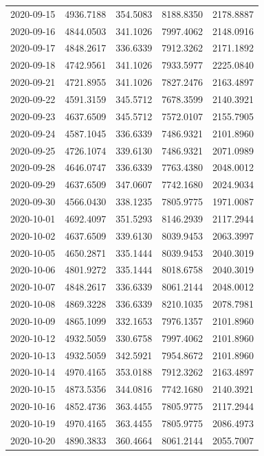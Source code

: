 \begin{footnotesize}
\begin{longtable}{lllll}
2020-09-15 & 4936.7188 & 354.5083 & 8188.8350 & 2178.8887 \\
2020-09-16 & 4844.0503 & 341.1026 & 7997.4062 & 2148.0916 \\
2020-09-17 & 4848.2617 & 336.6339 & 7912.3262 & 2171.1892 \\
2020-09-18 & 4742.9561 & 341.1026 & 7933.5977 & 2225.0840 \\
2020-09-21 & 4721.8955 & 341.1026 & 7827.2476 & 2163.4897 \\
2020-09-22 & 4591.3159 & 345.5712 & 7678.3599 & 2140.3921 \\
2020-09-23 & 4637.6509 & 345.5712 & 7572.0107 & 2155.7905 \\
2020-09-24 & 4587.1045 & 336.6339 & 7486.9321 & 2101.8960 \\
2020-09-25 & 4726.1074 & 339.6130 & 7486.9321 & 2071.0989 \\
2020-09-28 & 4646.0747 & 336.6339 & 7763.4380 & 2048.0012 \\
2020-09-29 & 4637.6509 & 347.0607 & 7742.1680 & 2024.9034 \\
2020-09-30 & 4566.0430 & 338.1235 & 7805.9775 & 1971.0087 \\
2020-10-01 & 4692.4097 & 351.5293 & 8146.2939 & 2117.2944 \\
2020-10-02 & 4637.6509 & 339.6130 & 8039.9453 & 2063.3997 \\
2020-10-05 & 4650.2871 & 335.1444 & 8039.9453 & 2040.3019 \\
2020-10-06 & 4801.9272 & 335.1444 & 8018.6758 & 2040.3019 \\
2020-10-07 & 4848.2617 & 336.6339 & 8061.2144 & 2048.0012 \\
2020-10-08 & 4869.3228 & 336.6339 & 8210.1035 & 2078.7981 \\
2020-10-09 & 4865.1099 & 332.1653 & 7976.1357 & 2101.8960 \\
2020-10-12 & 4932.5059 & 330.6758 & 7997.4062 & 2101.8960 \\
2020-10-13 & 4932.5059 & 342.5921 & 7954.8672 & 2101.8960 \\
2020-10-14 & 4970.4165 & 353.0188 & 7912.3262 & 2163.4897 \\
2020-10-15 & 4873.5356 & 344.0816 & 7742.1680 & 2140.3921 \\
2020-10-16 & 4852.4736 & 363.4455 & 7805.9775 & 2117.2944 \\
2020-10-19 & 4970.4165 & 363.4455 & 7805.9775 & 2086.4973 \\
2020-10-20 & 4890.3833 & 360.4664 & 8061.2144 & 2055.7007 \\

\end{longtable}
\end{footnotesize}
